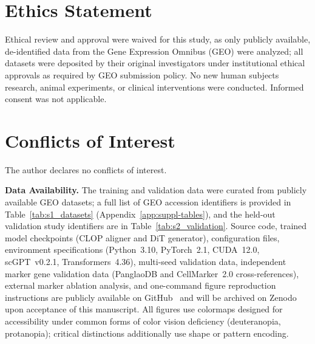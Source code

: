\documentclass[fleqn,10pt,lineno]{wlpeerj}
\begin{document}
\section*{Ethics Statement}

Ethical review and approval were waived for this study, as only publicly available, de-identified data from the Gene Expression Omnibus (GEO) were analyzed; all datasets were deposited by their original investigators under institutional ethical approvals as required by GEO submission policy. No new human subjects research, animal experiments, or clinical interventions were conducted. Informed consent was not applicable.

\section*{Conflicts of Interest}

The author declares no conflicts of interest.

\textbf{Data Availability.} The training and validation data were curated from publicly available GEO datasets; a full list of GEO accession identifiers is provided in Table~\ref{tab:s1_datasets} (Appendix~\ref{app:suppl-tables}), and the held-out validation study identifiers are in Table~\ref{tab:s2_validation}. Source code, trained model checkpoints (CLOP aligner and DiT generator), configuration files, environment specifications (Python~3.10, PyTorch~2.1, CUDA~12.0, scGPT~v0.2.1, Transformers~4.36), multi-seed validation data, independent marker gene validation data (PanglaoDB and CellMarker~2.0 cross-references), external marker ablation analysis, and one-command figure reproduction instructions are publicly available on GitHub~\citep{ref-clop-dit} and will be archived on Zenodo upon acceptance of this manuscript. All figures use colormaps designed for accessibility under common forms of color vision deficiency (deuteranopia, protanopia); critical distinctions additionally use shape or pattern encoding.
\end{document}
